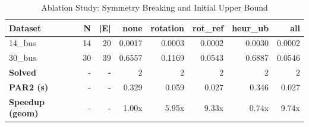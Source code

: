 \begin{table}[htbp]
\centering
\caption{Ablation Study: Symmetry Breaking and Initial Upper Bound}
\label{tab:table_ablation}
\begin{tabular}{lrrrrrrr}
\toprule
Dataset & N & |E| & none & rotation & rot\_ref & heur\_ub & all \\
\midrule
14\_bus & 14 & 20 & 0.0017 & 0.0003 & 0.0002 & 0.0030 & 0.0002 \\
30\_bus & 30 & 39 & 0.6557 & 0.1169 & 0.0543 & 0.6887 & 0.0546 \\
\midrule
\textbf{Solved} & - & - & 2 & 2 & 2 & 2 & 2 \\
\textbf{PAR2 (s)} & - & - & 0.329 & 0.059 & 0.027 & 0.346 & 0.027 \\
\textbf{Speedup (geom)} & - & - & 1.00x & 5.95x & 9.33x & 0.74x & 9.74x \\
\bottomrule
\end{tabular}
\end{table}
